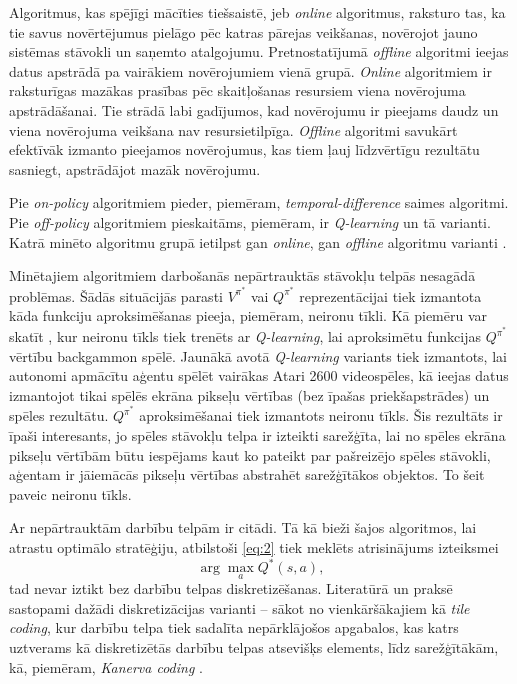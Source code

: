 \documentclass{ludis} %
\begin{document}
Algoritmus, kas spējīgi mācīties tiešsaistē, jeb \textit{online} algoritmus,
raksturo tas, ka tie savus novērtējumus pielāgo pēc katras pārejas veikšanas,
novērojot jauno sistēmas stāvokli un saņemto atalgojumu. Pretnostatījumā
\textit{offline} algoritmi ieejas datus apstrādā pa vairākiem novērojumiem vienā
grupā. \textit{Online} algoritmiem ir raksturīgas mazākas prasības pēc
skaitļošanas resursiem viena novērojuma apstrādāšanai. Tie strādā labi
gadījumos, kad novērojumu ir pieejams daudz un viena novērojuma veikšana nav
resursietilpīga. \textit{Offline} algoritmi savukārt efektīvāk izmanto pieejamos
novērojumus, kas tiem ļauj līdzvērtīgu rezultātu sasniegt, apstrādājot mazāk
novērojumu.

Pie \textit{on-policy} algoritmiem pieder, piemēram,
\textit{temporal-difference} saimes algoritmi. Pie \textit{off-policy}
algoritmiem pieskaitāms, piemēram, ir \textit{Q-learning} un tā varianti. Katrā
minēto algoritmu grupā ietilpst gan \textit{online}, gan \textit{offline}
algoritmu varianti \autocite{Barto}.

Minētajiem algoritmiem darbošanās nepārtrauktās stāvokļu telpās nesagādā
problēmas. Šādās situācijās parasti $V^{\pi^*}$ vai $Q^{\pi^*}$ reprezentācijai
tiek izmantota kāda funkciju aproksimēšanas pieeja, piemēram, neironu tīkli. Kā
piemēru var skatīt \autocite{tesauro1995temporal}, kur neironu tīkls tiek
trenēts ar \textit{Q-learning}, lai aproksimētu funkcijas $Q^{\pi^*}$ vērtību
backgammon spēlē. Jaunākā avotā \autocite{mnih2013playing} \textit{Q-learning}
variants tiek izmantots, lai autonomi apmācītu aģentu spēlēt vairākas Atari 2600
videospēles, kā ieejas datus izmantojot tikai spēlēs ekrāna pikseļu vērtības
(bez īpašas priekšapstrādes) un spēles rezultātu. $Q^{\pi^*}$ aproksimēšanai
tiek izmantots neironu tīkls. Šis rezultāts ir īpaši interesants, jo spēles
stāvokļu telpa ir izteikti sarežģīta, lai no spēles ekrāna pikseļu vērtībām būtu
iespējams kaut ko pateikt par pašreizējo spēles stāvokli, aģentam ir jāiemācās
pikseļu vērtības abstrahēt sarežģītākos objektos. To šeit paveic neironu tīkls.

Ar nepārtrauktām darbību telpām ir citādi. Tā kā bieži šajos algoritmos, lai
atrastu optimālo stratēģiju, atbilstoši \eqref{eq:2} tiek meklēts atrisinājums
izteiksmei
\[
	\arg \max_a Q^*(s, a),
\]
tad nevar iztikt bez darbību telpas diskretizēšanas. Literatūrā un praksē
sastopami dažādi diskretizācijas varianti -- sākot no vienkāršākajiem kā
\textit{tile coding}, kur darbību telpa tiek sadalīta nepārklājošos apgabalos,
kas katrs uztverams kā diskretizētās darbību telpas atsevišķs elements, līdz
sarežģītākām, kā, piemēram, \textit{Kanerva coding} \autocite{Barto}.
\end{document}
